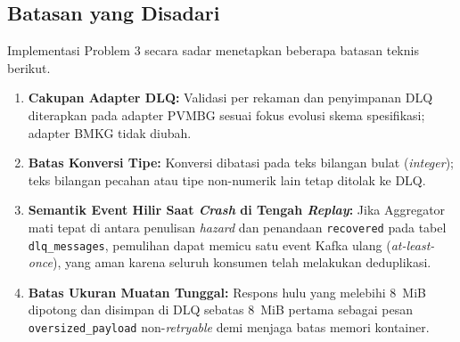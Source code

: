 \vspace{1em}

\subsection{Batasan yang Disadari}
Implementasi Problem 3 secara sadar menetapkan beberapa batasan teknis berikut.
\begin{enumerate}
    \item \textbf{Cakupan Adapter DLQ:} Validasi per rekaman dan penyimpanan DLQ diterapkan pada adapter PVMBG sesuai fokus evolusi skema spesifikasi; adapter BMKG tidak diubah.
    \item \textbf{Batas Konversi Tipe:} Konversi  dibatasi pada teks bilangan bulat (\textit{integer}); teks bilangan pecahan atau tipe non-numerik lain tetap ditolak ke DLQ.
    \item \textbf{Semantik Event Hilir Saat \textit{Crash} di Tengah \textit{Replay}:} Jika Aggregator mati tepat di antara penulisan \textit{hazard} dan penandaan \texttt{recovered} pada tabel \texttt{dlq\_messages}, pemulihan dapat memicu satu event Kafka ulang (\textit{at-least-once}), yang aman karena seluruh konsumen telah melakukan deduplikasi.
    \item \textbf{Batas Ukuran Muatan Tunggal:} Respons hulu yang melebihi 8~MiB dipotong dan disimpan di DLQ sebatas 8~MiB pertama sebagai pesan \texttt{oversized\_payload} non-\textit{retryable} demi menjaga batas memori kontainer.
\end{enumerate}

\vspace{1em}

